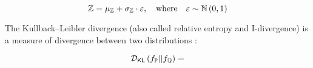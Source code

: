 \begin{equation}
 \mathbb{Z} = {\mu_{\mathbb{Z}}} + {\sigma_{\mathbb{Z}}} \cdot \varepsilon, \quad \mbox{where} \quad \varepsilon \sim \mathbb{N}\left(0,1\right)
\end{equation}

The Kullback–Leibler divergence (also called relative entropy and I-divergence) is a measure of divergence between two distributions \citep{KLD1951,csiszar1975}:

\begin{equation}
 \mathcal{D}_{\mathsf{KL}}\left(f_{\mathbb{P}} || f_{\mathbb{Q}} \right) =
\end{equation}

